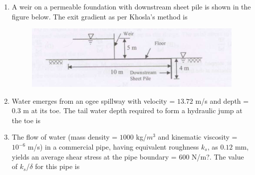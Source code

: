 \documentclass[journal]{IEEEtran}
\begin{document}
\begin{enumerate}
\item A weir on a permeable foundation with downstream sheet pile is shown in the figure below. The exit gradient as per Khosla's method is \hfill {}
\begin{figure}[H]
    \centering
    \includegraphics[width=0.6\columnwidth]{figs/fig4.png} 
    \caption{}
    \label{fig:placeholder}
\end{figure}
\begin{enumerate}
\end{enumerate}

\item Water emerges from an ogee spillway with velocity = $13.72$ m/s and depth = $0.3$ m at its toe. The tail water depth required to form a hydraulic jump at the toe is \hfill {}

\begin{enumerate}
\end{enumerate}

\item The flow of water (mass density = $1000$ kg/$m^{3}$ and kinematic viscosity = $10^{-6}$ m/s) in a commercial pipe, having equivalent roughness $k_s$, as $0.12$ mm, yields an average shear stress at the pipe boundary = $600$ N/m?. The value of $k_s$/$\delta$  for this pipe is \hfill {}

\begin{enumerate}
\end{enumerate}


\end{enumerate}
\end{document}
